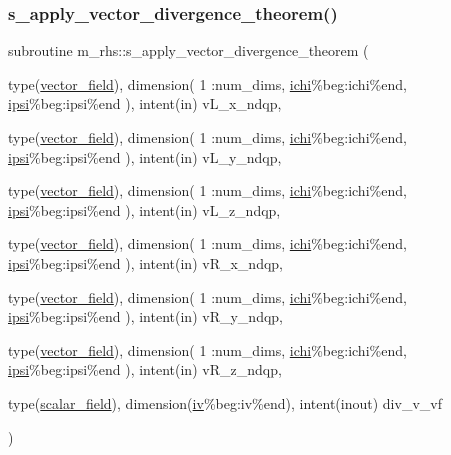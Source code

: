 \subsubsection{\texorpdfstring{s\+\_\+apply\+\_\+vector\+\_\+divergence\+\_\+theorem()}{s\_apply\_vector\_divergence\_theorem()}}
{\footnotesize\ttfamily subroutine m\+\_\+rhs\+::s\+\_\+apply\+\_\+vector\+\_\+divergence\+\_\+theorem (\begin{DoxyParamCaption}\item[{type(\hyperlink{structm__derived__types_1_1vector__field}{vector\+\_\+field}), dimension(     1   \+:num\+\_\+dims,                          \hyperlink{namespacem__rhs_ad2b935d288f68dbde65021da0498007d}{ichi}\%beg\+:ichi\%end,                          \hyperlink{namespacem__rhs_ae55731ba38044366ff7ddecf95297657}{ipsi}\%beg\+:ipsi\%end ), intent(in)}]{v\+L\+\_\+x\+\_\+ndqp,  }\item[{type(\hyperlink{structm__derived__types_1_1vector__field}{vector\+\_\+field}), dimension(     1   \+:num\+\_\+dims,                          \hyperlink{namespacem__rhs_ad2b935d288f68dbde65021da0498007d}{ichi}\%beg\+:ichi\%end,                          \hyperlink{namespacem__rhs_ae55731ba38044366ff7ddecf95297657}{ipsi}\%beg\+:ipsi\%end ), intent(in)}]{v\+L\+\_\+y\+\_\+ndqp,  }\item[{type(\hyperlink{structm__derived__types_1_1vector__field}{vector\+\_\+field}), dimension(     1   \+:num\+\_\+dims,                          \hyperlink{namespacem__rhs_ad2b935d288f68dbde65021da0498007d}{ichi}\%beg\+:ichi\%end,                          \hyperlink{namespacem__rhs_ae55731ba38044366ff7ddecf95297657}{ipsi}\%beg\+:ipsi\%end ), intent(in)}]{v\+L\+\_\+z\+\_\+ndqp,  }\item[{type(\hyperlink{structm__derived__types_1_1vector__field}{vector\+\_\+field}), dimension(     1   \+:num\+\_\+dims,                          \hyperlink{namespacem__rhs_ad2b935d288f68dbde65021da0498007d}{ichi}\%beg\+:ichi\%end,                          \hyperlink{namespacem__rhs_ae55731ba38044366ff7ddecf95297657}{ipsi}\%beg\+:ipsi\%end ), intent(in)}]{v\+R\+\_\+x\+\_\+ndqp,  }\item[{type(\hyperlink{structm__derived__types_1_1vector__field}{vector\+\_\+field}), dimension(     1   \+:num\+\_\+dims,                          \hyperlink{namespacem__rhs_ad2b935d288f68dbde65021da0498007d}{ichi}\%beg\+:ichi\%end,                          \hyperlink{namespacem__rhs_ae55731ba38044366ff7ddecf95297657}{ipsi}\%beg\+:ipsi\%end ), intent(in)}]{v\+R\+\_\+y\+\_\+ndqp,  }\item[{type(\hyperlink{structm__derived__types_1_1vector__field}{vector\+\_\+field}), dimension(     1   \+:num\+\_\+dims,                          \hyperlink{namespacem__rhs_ad2b935d288f68dbde65021da0498007d}{ichi}\%beg\+:ichi\%end,                          \hyperlink{namespacem__rhs_ae55731ba38044366ff7ddecf95297657}{ipsi}\%beg\+:ipsi\%end ), intent(in)}]{v\+R\+\_\+z\+\_\+ndqp,  }\item[{type(\hyperlink{structm__derived__types_1_1scalar__field}{scalar\+\_\+field}), dimension(\hyperlink{namespacem__rhs_a4ab97e22609b5ebbb97524ca7bae05ef}{iv}\%beg\+:iv\%end), intent(inout)}]{div\+\_\+v\+\_\+vf }\end{DoxyParamCaption})}
